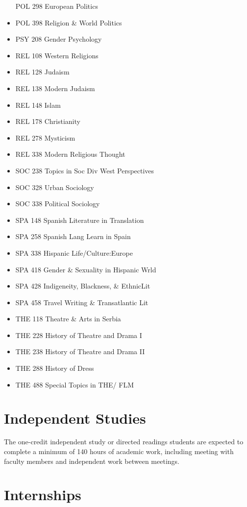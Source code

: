 \documentclass[
  letterpaper,
]{scrbook}
\begin{document}
\begin{itemize}
  POL 298 European Politics
\item
  POL 398 Religion \& World Politics
\item
  PSY 208 Gender Psychology
\item
  REL 108 Western Religions
\item
  REL 128 Judaism
\item
  REL 138 Modern Judaism
\item
  REL 148 Islam
\item
  REL 178 Christianity
\item
  REL 278 Mysticism
\item
  REL 338 Modern Religious Thought
\item
  SOC 238 Topics in Soc Div West Perspectives
\item
  SOC 328 Urban Sociology
\item
  SOC 338 Political Sociology
\item
  SPA 148 Spanish Literature in Translation
\item
  SPA 258 Spanish Lang Learn in Spain
\item
  SPA 338 Hispanic Life/Culture:Europe
\item
  SPA 418 Gender \& Sexuality in Hispanic Wrld
\item
  SPA 428 Indigeneity, Blackness, \& EthnicLit
\item
  SPA 458 Travel Writing \& Transatlantic Lit
\item
  THE 118 Theatre \& Arts in Serbia
\item
  THE 228 History of Theatre and Drama I
\item
  THE 238 History of Theatre and Drama II
\item
  THE 288 History of Dress
\item
  THE 488 Special Topics in THE/ FLM
\end{itemize}

\section{Independent Studies}\label{sec-independent-studies}

The one-credit independent study or directed readings students are
expected to complete a minimum of 140 hours of academic work, including
meeting with faculty members and independent work between meetings.

\section{Internships}\label{sec-internships}
\end{document}
